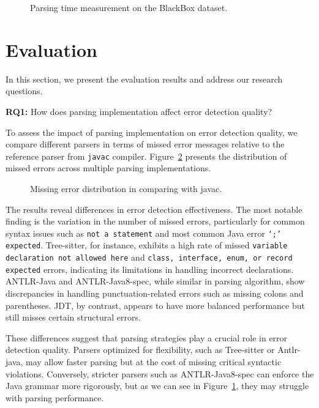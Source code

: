 \documentclass[conference]{IEEEtran}
\begin{document}
\begin{figure}[htbp]

\caption{Parsing time measurement on the BlackBox dataset.}\label{fig:fig-speed}
\end{figure}

\section{Evaluation}
In this section, we present the evaluation results and address our research questions.


\textbf{RQ1:} How does parsing implementation affect error detection quality?

To assess the impact of parsing implementation on error detection quality, we compare different parsers in terms of missed error messages relative to the reference parser from \texttt{javac} compiler. Figure~\ref{fig:error_distribution} presents the distribution of missed errors across multiple parsing implementations. 

\begin{figure}[htbp]

\caption{Missing error distribution in comparing with javac.}\label{fig:error_distribution}
\end{figure}

The results reveal differences in error detection effectiveness. The most notable finding is the variation in the number of missed errors, particularly for common syntax issues such as \texttt{not a statement} and most common Java error\cite{error-frequence} \texttt{`;' expected}. Tree-sitter, for instance, exhibits a high rate of missed \texttt{variable declaration not allowed here} and \texttt{class, interface, enum, or record expected}  errors, indicating its limitations in handling incorrect declarations. ANTLR-Java and ANTLR-Java8-spec, while similar in parsing algorithm, show discrepancies in handling punctuation-related errors such as missing colons and parentheses. JDT, by contrast, appears to have more balanced performance but still misses certain structural errors.

These differences suggest that parsing strategies play a crucial role in error detection quality. Parsers optimized for flexibility, such as Tree-sitter or Antlr-java, may allow faster parsing but at the cost of missing critical syntactic violations. Conversely, stricter parsers such as ANTLR-Java8-spec can enforce the Java grammar more rigorously, but as we can see in Figure~\ref{fig:fig-speed}, they may struggle with parsing performance.
\end{document}
